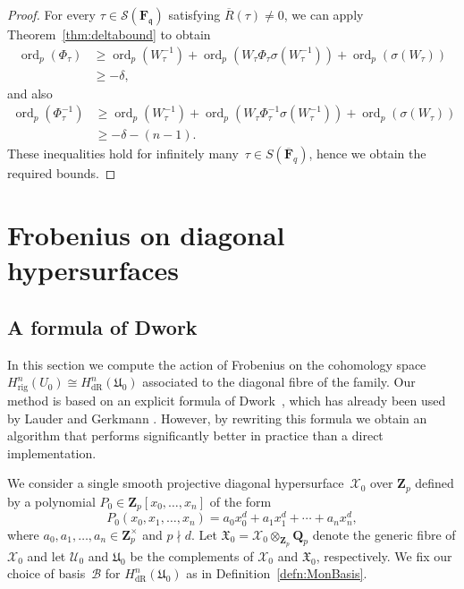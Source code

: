 \documentclass[a4paper,11pt]{article}
\numberwithin{equation}{section}
\newcommand{\ZZ}{\mathbf{Z}} %
\newcommand{\QQ}{\mathbf{Q}} %
\newcommand{\FF}{\mathbf{F}} %
\DeclareMathOperator{\ord}{ord}          %
\providecommand{\HdR}{H_{\text{dR}}}    %
\providecommand{\Hrig}{H_{\text{rig}}}  %
\providecommand{\cB}{\mathcal{B}} %
\theoremstyle{definition}
\begin{document}
\begin{proof}
For every $\tau \in \mathcal{S}(\FF_{\mathfrak{q}})$ satisfying 
$\overline{R}(\tau) \neq 0$, we can apply Theorem~\ref{thm:deltabound} 
to obtain
\begin{align*}
\ord_p(\Phi_{\tau}) &\geq \ord_p(W^{-1}_{\tau}) + 
                          \ord_p(W_{\tau} \Phi_{\tau} \sigma(W_{\tau}^{-1})) + 
                          \ord_p(\sigma(W_{\tau})) \\
                    &\geq -\delta,
\end{align*}
and also
\begin{align*}
\ord_p(\Phi^{-1}_{\tau}) &\geq \ord_p(W^{-1}_{\tau}) + 
                               \ord_p(W_{\tau} \Phi^{-1}_{\tau} \sigma(W_{\tau}^{-1})) + 
                               \ord_p(\sigma(W_{\tau})) \\
                         &\geq -\delta - (n-1).
\end{align*}
These inequalities hold for infinitely many~$\tau \in S(\overline{\FF}_q)$, 
hence we obtain the required bounds.
\end{proof}


\section{Frobenius on diagonal hypersurfaces}
\label{sec:Diagonal}

\subsection{A formula of Dwork}

In this section we compute the action of Frobenius on the cohomology 
space $\Hrig^{n}(U_0) \cong \HdR^{n}(\mathfrak{U}_0)$ associated 
to the diagonal fibre of the family. Our method is based on an 
explicit formula of Dwork~\citep[\S 4]{Dwork1964}, which has already 
been used by Lauder \cite{Lauder2004b} and Gerkmann 
\cite{Gerkmann2007}. However, by rewriting this formula we obtain an 
algorithm that performs significantly better in practice than a direct 
implementation.

We consider a single smooth 
projective diagonal hypersurface~$\mathcal{X}_0$ over $\ZZ_p$ defined by 
a polynomial $P_0 \in \ZZ_p[x_0, \dotsc, x_n]$ of the form
\begin{equation*}
P_0(x_0, x_1, \dotsc, x_n) = 
    a_0 x_0^d + a_1 x_1^d + \dotsb + a_n x_n^d,
\end{equation*}
where $a_0, a_1, \dotsc, a_n \in \ZZ_p^{\times}$ and $p \nmid d$. 
Let $\mathfrak{X}_0 = \mathcal{X}_0 \otimes_{\ZZ_p} \QQ_p$ denote the generic 
fibre of $\mathcal{X}_0$ and let $\mathcal{U}_0$ and $\mathfrak{U}_0$ be the 
complements of $\mathcal{X}_0$ and $\mathfrak{X}_0$, respectively. 
We fix our choice of basis~$\cB$ for $\HdR^{n}(\mathfrak{U}_0)$ 
as in Definition~\ref{defn:MonBasis}. 
\end{document}
